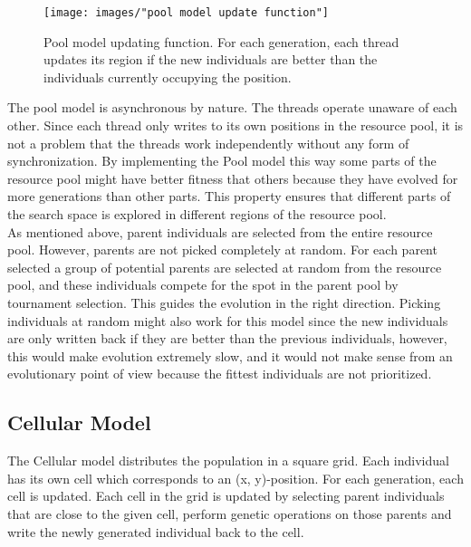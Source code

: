 \begin{figure}[h!]
\begin{center}
\texttt{[image: images/"pool model update function"]}
\caption{Pool model updating function. For each generation, each thread updates its region if the new individuals are better than the individuals currently occupying the position.}
\label{figure:pool model update function}
\end{center}
\end{figure}


\noindent The pool model is asynchronous by nature. The threads operate unaware of each other. Since each thread only writes to its own positions in the resource pool, it is not a problem that the threads work independently without any form of synchronization. By implementing the Pool model this way some parts of the resource pool might have better fitness that others because they have evolved for more generations than other parts. This property ensures that different parts of the search space is explored in different regions of the resource pool. \\


\noindent As mentioned above, parent individuals are selected from the entire resource pool. However, parents are not picked completely at random. For each parent selected a group of potential parents are selected at random from the resource pool, and these individuals compete for the spot in the parent pool by tournament selection. This guides the evolution in the right direction. Picking individuals at random might also work for this model since the new individuals are only written back if they are better than the previous individuals, however, this would make evolution extremely slow, and it would not make sense from an evolutionary point of view because the fittest individuals are not prioritized.


\subsection{Cellular Model}


\noindent The Cellular model distributes the population in a square grid. Each individual has its own cell which corresponds to an (x, y)-position. For each generation, each cell is updated. Each cell in the grid is updated by selecting parent individuals that are close to the given cell, perform genetic operations on those parents and write the newly generated individual back to the cell.\\


